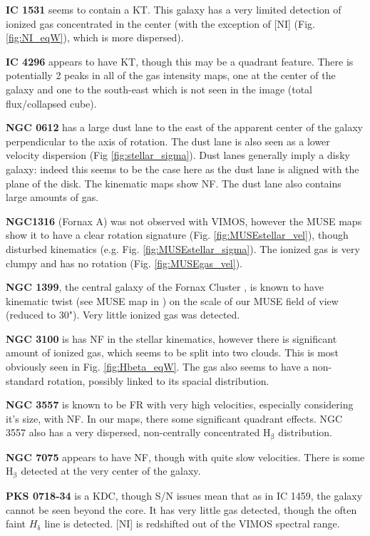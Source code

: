 \documentclass[fleqn,usenatbib,useAMS]{mnras}
\begin{document}
	\textbf{IC 1531} seems to contain a KT. This galaxy has a very limited detection of ionized gas concentrated in the center (with the exception of [NI] (Fig. \ref{fig:NI_eqW}), which is more dispersed).

	\textbf{IC 4296} appears to have KT, though this may be a quadrant feature. There is potentially 2 peaks in all of the gas intensity maps, one at the center of the galaxy and one to the south-east which is not seen in the image (total flux/collapsed cube).

	\textbf{NGC 0612} has a large dust lane to the east of the apparent center of the galaxy perpendicular to the axis of rotation. The dust lane is also seen as a lower velocity dispersion (Fig \ref{fig:stellar_sigma}). Dust lanes generally imply a disky galaxy: indeed this seems to be the case here as the dust lane is aligned with the plane of the disk. The kinematic maps show NF. The dust lane also contains large amounts of gas. 

	\textbf{NGC1316} (Fornax A) was not observed with VIMOS, however the MUSE maps show it to have a clear rotation signature (Fig. \ref{fig:MUSEstellar_vel}), though disturbed kinematics (e.g. Fig. \ref{fig:MUSEstellar_sigma}). The ionized gas is very clumpy and has no rotation (Fig. \ref{fig:MUSEgas_vel}).

	\textbf{NGC 1399}, the central galaxy of the Fornax Cluster \citep{Jordan2007}, is known to have kinematic twist (see MUSE map in \citet{Zieleniewski2017}) on the scale of our MUSE field of view (reduced to 30"). Very little ionized gas was detected. 

	\textbf{NGC 3100} is has NF in the stellar kinematics, however there is significant amount of ionized gas, which seems to be split into two clouds. This is most obviously seen in Fig. \ref{fig:Hbeta_eqW}. The gas also seems to have a non-standard rotation, possibly linked to its spacial distribution. 

	\textbf{NGC 3557} is known to be FR with very high velocities, especially considering it's size, with NF. In our maps, there some significant quadrant effects. NGC 3557 also has a very dispersed, non-centrally concentrated H$_\mathrm{\beta}$ distribution. 

	\textbf{NGC 7075} appears to have NF, though with quite slow velocities. There is some H$_\mathrm{\beta}$ detected at the very center of the galaxy. 

	\textbf{PKS 0718-34} is a KDC, though S/N issues mean that as in IC 1459, the galaxy cannot be seen beyond the core. It has very little gas detected, though the often faint $H_\mathrm{\delta}$ line is detected. [NI] is redshifted out of the VIMOS spectral range.
\end{document}
